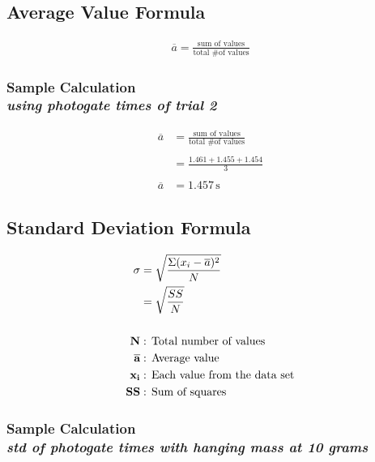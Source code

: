 \subsection{Average Value Formula} 

\begin{align*}
	\overline{a} = \frac{\text{sum of values}}{\text{total \# of values}} 
\end{align*}

\subsubsection{Sample Calculation \\ {\normalfont \small\textit{using photogate times of trial 2}}}

\begin{align*}
	\overline{a}&=\frac{\text{sum of values}}{\text{total \# of values}} \\ \\
							&= \frac{1.461+1.455+1.454}{3} \\ \\
	\overline{a}&= \boxed{1.457\,\text{s}}
\end{align*}

\subsection{Standard Deviation Formula}

\begin{align*}
		\sigma &= \sqrt{\frac{\Sigma(x_i -\overline{a})^2}{N}} \\
		 &= \sqrt{\frac{SS}{N}} \\ \\
		\textbf{N} &:\, \text{Total number of values} \\
		\overline{\textbf{a}} &:\, \text{Average value} \\
		\textbf{x\textsubscript{i}} &:\, \text{Each value from the data set} \\
		\textbf{SS} &:\, \text{Sum of squares} 
\end{align*}

\subsubsection{Sample Calculation \\ {\normalfont \small\textit{std of photogate times with hanging mass at 10 grams }}}

